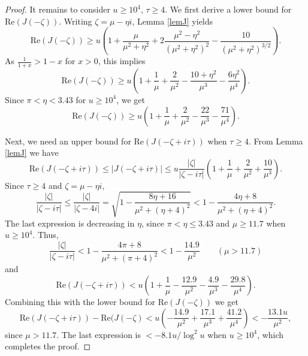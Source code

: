 \documentclass[10pt,a4paper]{amsart}
\begin{document}
\begin{proof}
It remains to consider $u\ge 10^4$, $\tau \ge 4$. 
We first derive a lower bound for $\mathrm{Re}(J(-\zeta))$. 
Writing $\zeta=\mu-\eta i$, Lemma \ref{lemJ} yields
$$
\mathrm{Re}(J(-\zeta)) \ge u\left(1+ \frac{\mu}{\mu^2+\eta^2}+2\frac{\mu^2-\eta^2}{(\mu^2+\eta^2)^2}-\frac{10}{(\mu^2+\eta^2)^{3/2}}\right).
$$
As $\frac{1}{1+x}>1-x$ for $x>0$, this implies
$$
\mathrm{Re}(J(-\zeta)) \ge u\left(1+ \frac{1}{\mu}+\frac{2}{\mu^2}-\frac{10+\eta^2}{\mu^3}-\frac{6\eta^2}{\mu^4}\right).
$$
Since $\pi < \eta < 3.43$ for $u\ge 10^4$, we get
$$
\mathrm{Re}(J(-\zeta)) \ge u\left(1+ \frac{1}{\mu}+\frac{2}{\mu^2}-\frac{22}{\mu^3}-\frac{71}{\mu^4}\right).
$$

Next, we need an upper bound for $\mathrm{Re}(J(-\zeta+i\tau))$ when $\tau\ge 4$. 
From Lemma \ref{lemJ} we have
$$
\mathrm{Re}(J(-\zeta+i\tau))\le |J(-\zeta+i\tau)| \le u \frac{|\zeta|}{|\zeta-i\tau|}\left(1+\frac{1}{\mu}+\frac{2}{\mu^2}+\frac{10}{\mu^3}\right).
$$
Since $\tau\ge 4$ and $\zeta=\mu-\eta i$, 
$$
\frac{|\zeta|}{|\zeta-i\tau|} 
\le \frac{|\zeta|}{|\zeta- 4i|}
= \sqrt{1-\frac{8\eta+16}{\mu^2+(\eta+4)^2}}
<1-\frac{4\eta+8}{\mu^2+(\eta+4)^2}.
$$
The last expression
is decreasing in $\eta$, since $\pi<\eta\le 3.43$ and $\mu\ge 11.7$ when $u\ge 10^4$. Thus,
$$
\frac{|\zeta|}{|\zeta-i\tau|}< 1-\frac{4\pi+8}{\mu^2+(\pi+4)^2}<1-\frac{14.9}{\mu^2} \qquad (\mu >11.7)
$$
and
$$
\mathrm{Re}(J(-\zeta+i\tau))< u \left(1+\frac{1}{\mu}-\frac{12.9}{\mu^2}-\frac{4.9}{\mu^3}-\frac{29.8}{\mu^4}\right).
$$
Combining this with the lower bound for $\mathrm{Re}(J(-\zeta))$ we get
$$
\mathrm{Re}(J(-\zeta+i\tau))-\mathrm{Re}(J(-\zeta)< u\left(-\frac{14.9}{\mu^2}+\frac{17.1}{\mu^3}+\frac{41.2}{\mu^4}\right)<-\frac{13.1u}{\mu^2},
$$
since $\mu>11.7$. The last expression is $<-8.1u/\log^2 u$ when $u\ge 10^4$, which completes the proof. 
\end{proof}
\end{document}
